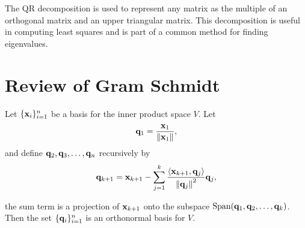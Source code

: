 \label{lab:QRdecomp}


The QR decomposition is used to represent any matrix as the multiple of an orthogonal matrix and an upper triangular matrix. This decomposition is useful in computing least squares and is part of a common method for finding eigenvalues.

\section*{Review of Gram Schmidt}

\vspace{5mm}
\begin{theorem} Let
$\{{\bf x}_i\}_{i=1}^n$ be a basis for the inner product space $V$. Let
\[
{\bf q}_1 = \frac{{\bf x}_1}{\left\lVert{\bf x}_1\right\rVert},
\]
and define ${\bf q}_2,{\bf q}_3,\ldots,{\bf q}_n$ recursively by
\[
{\bf q}_{k+1} = {\bf x}_{k+1} - \sum^k_{j=1}\frac{\langle {\bf x}_{k+1}, {\bf q}_j\rangle}{\left\lVert{\bf q}_{j}\right\rVert^2}{\bf q}_j,
\]

the sum term is a projection of ${\bf x}_{k+1}$ onto the subspace $\mbox{Span}({\bf q}_1,{\bf q}_2,\ldots,{\bf q}_k)$.  Then the set $\{{\bf q}_i\}_{i=1}^n$ is an orthonormal basis for $V$.
\end{theorem}
\vspace{5mm}

